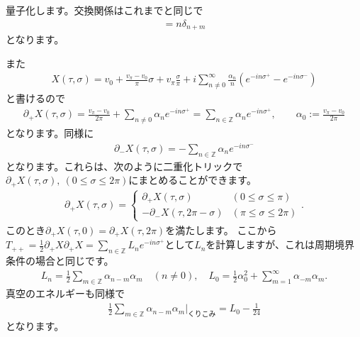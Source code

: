 \documentclass[report,paper=a4, fontsize=12pt, line_length=16cm, number_of_lines=34,dvipdfmx]{jlreq}
\numberwithin{equation}{chapter}
\numberwithin{equation}{section}
\newcommand{\Zb}{\mathbb{Z}}
\newcommand{\del}{\partial}
\begin{document}
量子化します。交換関係はこれまでと同じで
\begin{align}
  [\alpha_n,\alpha_m]=n\delta_{n+m}
\end{align}
となります。

また
\begin{align}
  X(\tau,\sigma)=v_{0}+\frac{v_{\pi}-v_{0}}{\pi}\sigma+v_{\pi}\frac{\sigma}{\pi}+i\sum_{n\ne 0}^{\infty}\frac{\alpha_{n}}{n}\left( e^{-in\sigma^{+}}-e^{-in\sigma^{-}} \right)
\end{align}
と書けるので
\begin{align}
  \del_{+}X(\tau,\sigma)=\frac{v_{\pi}-v_{0}}{2\pi}+\sum_{n\ne 0}\alpha_{n}e^{-in\sigma^{+}}=\sum_{n\in \Zb}\alpha_{n}e^{-in\sigma^{+}},\qquad \alpha_{0}:=\frac{v_{\pi}-v_{0}}{2\pi}
  \label{DDmodeexp}
\end{align}
となります。同様に
\begin{align}
  \del_{-}X(\tau,\sigma)=-\sum_{n\in \Zb}\alpha_{n}e^{-in\sigma^{-}}
\end{align}
となります。これらは、次のように二重化トリックで$\del_{+}X(\tau,\sigma),\ (0\le \sigma \le 2\pi)$にまとめることができます。
\begin{align}
  \del_{+}X(\tau,\sigma)=
  \begin{cases}
    \del_{+}X(\tau,\sigma)& (0\le \sigma \le \pi)\\
    -\del_{-}X(\tau,2\pi-\sigma) & (\pi\le \sigma \le 2\pi)
  \end{cases}.
\end{align}
このとき$\del_{+}X(\tau,0)=\del_{+}X(\tau,2\pi)$を満たします。
ここから$T_{++}=\frac12\del_{+}X\del_{+}X=\sum_{n\in \Zb}L_{n}e^{-in\sigma^{+}}$として$L_n$を計算しますが、これは周期境界条件の場合と同じです。
\begin{align}
  L_{n}=\frac12 \sum_{m\in\Zb}\alpha_{n-m}\alpha_{m}\quad (n\ne 0),\quad
  L_{0}=\frac12 \alpha_{0}^2+\sum_{m=1}^{\infty}\alpha_{-m}\alpha_{m}.
\end{align}
真空のエネルギーも同様で
\begin{align}
  \frac12 \sum_{m\in\Zb}\alpha_{n-m}\alpha_{m}\Bigg|_{\text{くりこみ}}=L_0-\frac{1}{24}
\end{align}
となります。
\end{document}
